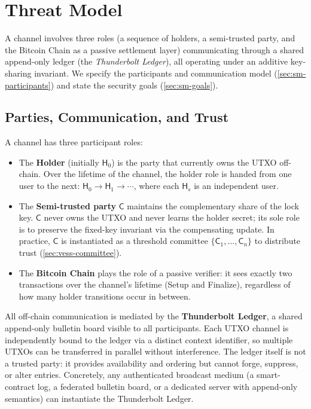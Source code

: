 \section{Threat Model}\label{sec:threat-model}

A \thunderbolt channel involves three roles (a sequence of holders, a semi-trusted party, and the Bitcoin Chain as a passive settlement layer) communicating through a shared append-only ledger (the \emph{Thunderbolt Ledger}), all operating under an additive key-sharing invariant. We specify the participants and communication model (\autoref{sec:sm-participants}) and state the security goals (\autoref{sec:sm-goals}).

\subsection{Parties, Communication, and Trust}\label{sec:sm-participants}

A \thunderbolt channel has three participant roles:

\begin{itemize}
  \item The \textbf{Holder} (initially $\mathsf{H}_0$) is the party that currently owns the UTXO off-chain. Over the lifetime of the channel, the holder role is handed from one user to the next: $\mathsf{H}_0 \to \mathsf{H}_1 \to \cdots$, where each $\mathsf{H}_s$ is an independent user.
  \item The \textbf{Semi-trusted party} $\mathsf{C}$ maintains the complementary share of the lock key. $\mathsf{C}$ never owns the UTXO and never learns the holder secret; its sole role is to preserve the fixed-key invariant via the compensating update. In practice, $\mathsf{C}$ is instantiated as a threshold committee $\{\mathsf{C}_1, \ldots, \mathsf{C}_n\}$ to distribute trust (\autoref{sec:vess-committee}).
  \item The \textbf{Bitcoin Chain} plays the role of a passive verifier: it sees exactly two transactions over the channel's lifetime (Setup and Finalize), regardless of how many holder transitions occur in between.
\end{itemize}

All off-chain communication is mediated by the \textbf{Thunderbolt Ledger}, a shared append-only bulletin board visible to all participants. Each UTXO channel is independently bound to the ledger via a distinct context identifier, so multiple UTXOs can be transferred in parallel without interference. The ledger itself is not a trusted party: it provides availability and ordering but cannot forge, suppress, or alter entries. Concretely, any authenticated broadcast medium (a smart-contract log, a federated bulletin board, or a dedicated server with append-only semantics) can instantiate the Thunderbolt Ledger.

